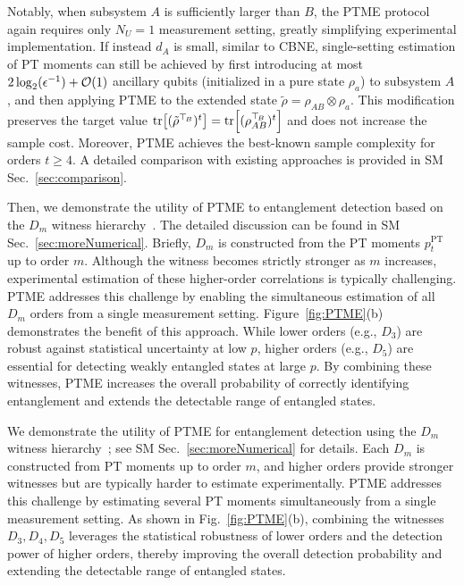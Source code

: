 \documentclass[aps,prl,twocolumn,nofootinbib,superscriptaddress,10pt]{revtex4-2}
\let\originalleft\left
\let\originalright\right
\renewcommand{\left}{\mathopen{}\mathclose\bgroup\originalleft}
\renewcommand{\right}{\aftergroup\egroup\originalright}
\DeclareMathOperator{\Tr}{tr}
\newcommand{\bigo}[1]{\mathcal{O}\left(#1\right)}
\theoremstyle{plain}
\theoremstyle{definition}
\newcommand{\PT}{\mathrm{PT}}
\begin{document}
Notably, when subsystem $A$ is sufficiently larger than $B$, the PTME protocol again requires only $N_U=1$ measurement setting, greatly simplifying experimental implementation. 
If instead $d_A$ is small, similar to CBNE, single-setting estimation of PT moments can still be achieved by first introducing at most $2\log_2 (\epsilon^{-1}) +\bigo{1}$ ancillary qubits (initialized in a pure state $\rho_a$) to subsystem $A$, and then applying PTME to the extended state $\tilde{\rho} = \rho_{AB}\otimes \rho_a$. 
This modification preserves the target value $\Tr\left[(\tilde\rho^{\top_{\! B}})^t\right]=\Tr\left[(\rho_{AB}^{\top_{\! B}})^t\right]$ and does not increase the sample cost. 
Moreover, PTME achieves the best-known sample complexity for orders $t\geq 4$. 
A detailed comparison with existing approaches is provided in SM Sec.~\ref{sec:comparison}.


Then, we demonstrate the utility of PTME to entanglement detection based on the $D_m$ witness hierarchy~\cite{Neven2021Entanglement}. The detailed discussion can be found in SM Sec.~\ref{sec:moreNumerical}. Briefly, $D_m$ is constructed from the PT moments $p_t^{\PT}$ up to order $m$. Although the witness becomes strictly stronger as $m$ increases, experimental estimation of these higher-order correlations is typically challenging. PTME addresses this challenge by enabling the simultaneous estimation of all $D_m$ orders from a single measurement setting. Figure~\ref{fig:PTME}(b) demonstrates the benefit of this approach. While lower orders (e.g., $D_3$) are robust against statistical uncertainty at low $p$, higher orders (e.g., $D_5$) are essential for detecting weakly entangled states at large $p$. By combining these witnesses, PTME increases the overall probability of correctly identifying entanglement and extends the detectable range of entangled states.
\fi



We demonstrate the utility of PTME for entanglement detection using the \(D_m\) witness hierarchy~\cite{Neven2021Entanglement}; see SM Sec.~\ref{sec:moreNumerical} for details. 
Each \(D_m\) is constructed from PT moments up to order \(m\), and higher orders provide stronger witnesses but are typically harder to estimate experimentally. 
PTME addresses this challenge by estimating several PT moments simultaneously from a single measurement setting. 
As shown in Fig.~\ref{fig:PTME}(b), combining the witnesses \(D_3,D_4,D_5\) leverages the statistical robustness of lower orders and the detection power of higher orders, thereby improving the overall detection probability and extending the detectable range of entangled states.
\end{document}
